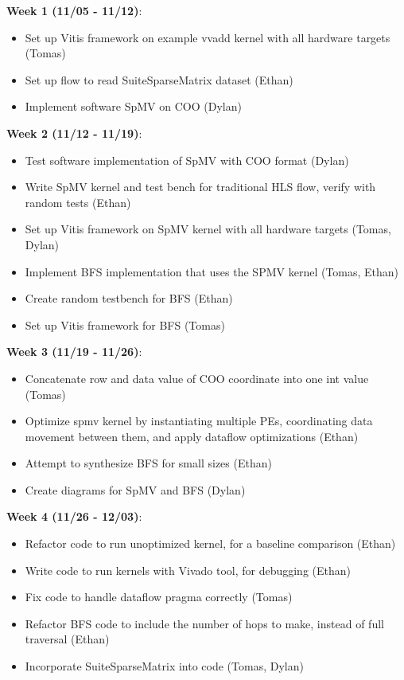 \documentclass[10pt]{article}
\begin{document}
\noindent \textbf{Week 1 (11/05 - 11/12)}:
\begin{itemize}
  \item Set up Vitis framework on example vvadd kernel with all hardware targets (Tomas)
  \item Set up flow to read SuiteSparseMatrix dataset (Ethan)
  \item Implement software SpMV on COO (Dylan)
\end{itemize}

\noindent \textbf{Week 2 (11/12 - 11/19)}:
\begin{itemize}
  \item Test software implementation of SpMV with COO format (Dylan)
  \item Write SpMV kernel and test bench for traditional HLS flow, verify with random tests (Ethan)
  \item Set up Vitis framework on SpMV kernel with all hardware targets (Tomas, Dylan)
  \item Implement BFS implementation that uses the SPMV kernel (Tomas, Ethan)
  \item Create random testbench for BFS (Ethan)
  \item Set up Vitis framework for BFS (Tomas)
\end{itemize}

\noindent \textbf{Week 3 (11/19 - 11/26)}:
\begin{itemize}
  \item Concatenate row and data value of COO coordinate into one int value (Tomas)
  \item Optimize spmv kernel by instantiating multiple PEs, coordinating data movement between them, and apply dataflow optimizations (Ethan)
  \item Attempt to synthesize BFS for small sizes (Ethan)
  \item Create diagrams for SpMV and BFS (Dylan)
\end{itemize}

\noindent \textbf{Week 4 (11/26 - 12/03)}:
\begin{itemize}
  \item Refactor code to run unoptimized kernel, for a baseline comparison (Ethan)
  \item Write code to run kernels with Vivado tool, for debugging (Ethan)
  \item Fix code to handle dataflow pragma correctly (Tomas)
  \item Refactor BFS code to include the number of hops to make, instead of full traversal (Ethan)
  \item Incorporate SuiteSparseMatrix into code (Tomas, Dylan)
\end{itemize}
\end{document}

